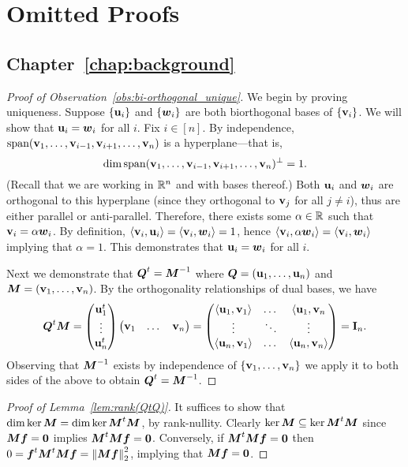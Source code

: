 \appendix 
\chapter{Omitted Proofs}
\label{chap:app}

\section{Chapter~\ref{chap:background}}
\label{sec:app_proofs_background}


\begin{proof}[Proof  of  Observation~\ref{obs:bi-orthogonal_unique}]
	We begin by  proving uniqueness. 
	Suppose $\{\vb{u}_i\}$ and $\{\vb*{w}_i\}$ are both biorthogonal bases of $\{\vb{v}_i\}$. We will show that $\vb{u}_i=\vb*{w}_i$  for all $i$. Fix $i\in[n]$. By independence, $\textnormal{span}(\vb{v}_1,\dots,\vb{v}_{i-1},\vb{v}_{i+1},\dots,\vb{v}_n)$ is a hyperplane---that is, \[\dim\textnormal{span}(\vb{v}_1,\dots,\vb{v}_{i-1},\vb{v}_{i+1},\dots,\vb{v}_n)^\perp=1.\] (Recall  that we are  working in $\mathbb{R}^n$ and with bases thereof.) Both $\vb{u}_i$ and $\vb*{w}_i$ are orthogonal to this hyperplane (since they orthogonal to $\vb{v}_j$ for all $j\neq i$), thus are either parallel or anti-parallel. Therefore, there exists some $\alpha\in\mathbb{R}$ such that $\vb{v}_i=\alpha\vb*{w}_i$. By definition, $\langle \vb{v}_i,\vb{u}_i\rangle = \langle \vb{v}_i,\vb*{w}_i\rangle =1$, hence $\langle \vb{v}_i,\alpha \vb*{w}_i\rangle = \langle \vb{v}_i,\vb*{w}_i\rangle$ implying that $\alpha=1$. This demonstrates that $\vb{u}_i=\vb*{w}_i$ for all $i$. 
	
	Next we demonstrate that  $\vb*{Q}^t={\vb*{M}}^{-1}$ where $\vb*{Q}=(\vb{u}_1,\dots,\vb{u}_n)$ and ${\vb*{M}}=(\vb{v}_1,\dots,\vb{v}_n)$. By the orthogonality relationships of dual bases, we have  
	\[\vb*{Q}^t{\vb*{M}} = \begin{pmatrix}
	\vb{u}_1^t \\
	\vdots  \\
	\vb{u}_n^t
	\end{pmatrix}
	\begin{pmatrix}
	\vb{v}_1 & \dots & \vb{v}_n
	\end{pmatrix} = \begin{pmatrix}
	\langle \vb{u}_1,\vb{v}_1\rangle & \dots & \langle \vb{u}_1,\vb{v}_n \\
	\vdots & \ddots & \vdots  \\
	\langle \vb{u}_n,\vb{v}_1\rangle & \dots & \langle \vb{u}_n,\vb{v}_n\rangle 
	\end{pmatrix} = \vb{I}_n.
	\]
	Observing that ${\vb*{M}}^{-1}$ exists by independence of $\{\vb{v}_1,\dots,\vb{v}_n\}$ we apply it  to  both sides of the  above to obtain   $\vb*{Q}^t={\vb*{M}}^{-1}$. 
\end{proof}

\begin{proof}[Proof of Lemma~\ref{lem:rank(QtQ)}]
	It suffices to show that $\dim\ker{\vb*{M}} = \dim\ker{\vb*{M}}^t {\vb*{M}}$, by rank-nullity. Clearly $\ker{\vb*{M}} \subseteq \ker{\vb*{M}}^t{\vb*{M}}$ since ${\vb*{M}}\vb*{f}=\vb{0}$ implies ${\vb*{M}}^t{\vb*{M}}\vb*{f}=\vb{0}$. Conversely, if ${\vb*{M}}^t{\vb*{M}}\vb*{f}=\vb{0}$ then $0=\vb*{f}^t {\vb*{M}}^t {\vb*{M}}\vb*{f} = \norm{{\vb*{M}}\vb*{f}}_2^2$, implying that ${\vb*{M}}\vb*{f}=\vb{0}$.  
\end{proof}

